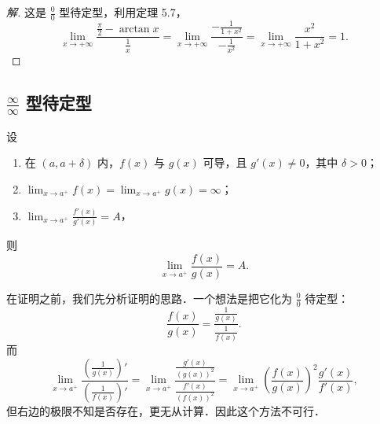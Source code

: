 \begin{proof}[解]
这是 $\frac{0}{0}$ 型待定型，利用定理 5.7，
\[
\lim_{x\to+\infty} \frac{\frac{\pi}{2} - \arctan x}{\frac{1}{x}} = \lim_{x\to+\infty} \frac{-\frac{1}{1+x^2}}{-\frac{1}{x^2}} = \lim_{x\to+\infty} \frac{x^2}{1+x^2} = 1.
\]
\end{proof}

\subsection{\texorpdfstring{$\frac{\infty}{\infty}$}{infty/infty} 型待定型}

\begin{theorem}\label{thm:5-8}
设
\begin{enumerate}[(1)]
\item 在 $(a, a+\delta)$ 内，$f(x)$ 与 $g(x)$ 可导，且 $g'(x) \neq 0$，其中 $\delta > 0$；
\item $\lim_{x\to a^+} f(x) = \lim_{x\to a^+} g(x) = \infty$；
\item $\lim_{x\to a^+} \frac{f'(x)}{g'(x)} = A$，
\end{enumerate}
则
\[
\lim_{x\to a^+} \frac{f(x)}{g(x)} = A.
\]
\end{theorem}

在证明之前，我们先分析证明的思路．一个想法是把它化为 $\frac{0}{0}$ 待定型：
\[
\frac{f(x)}{g(x)} = \frac{\frac{1}{g(x)}}{\frac{1}{f(x)}}.
\]
而
\[
\lim_{x\to a^+}\frac{\left(\frac{1}{g(x)}\right)'}{\left(\frac{1}{f(x)}\right)'}
= \lim_{x\to a^+}\frac{\frac{g'(x)}{(g(x))^2}}{\frac{f'(x)}{(f(x))^2}}
= \lim_{x\to a^+}\left(\frac{f(x)}{g(x)}\right)^2\frac{g'(x)}{f'(x)},
\]
但右边的极限不知是否存在，更无从计算．因此这个方法不可行．

